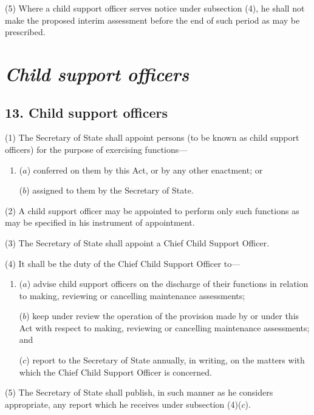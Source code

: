 \documentclass[12pt,a4paper]{article}
\begin{document}
(5) Where a child support officer serves notice under subsection (4), he shall not make the proposed interim assessment before the end of such period as may be prescribed.


\section{\itshape Child support officers}

\subsection{13. Child support officers}

(1) The Secretary of State shall appoint persons (to be known as child support officers) for the purpose of exercising functions—
\begin{enumerate}\item[]
($a$) conferred on them by this Act, or by any other enactment; or

($b$) assigned to them by the Secretary of State.
\end{enumerate}

(2) A child support officer may be appointed to perform only such functions as may be specified in his instrument of appointment.

(3) The Secretary of State shall appoint a Chief Child Support Officer.

(4) It shall be the duty of the Chief Child Support Officer to—
\begin{enumerate}\item[]
($a$) advise child support officers on the discharge of their functions in relation to making, reviewing or cancelling maintenance assessments;

($b$) keep under review the operation of the provision made by or under this Act with respect to making, reviewing or cancelling maintenance assessments; and

($c$) report to the Secretary of State annually, in writing, on the matters with which the Chief Child Support Officer is concerned.
\end{enumerate}

(5) The Secretary of State shall publish, in such manner as he considers appropriate, any report which he receives under subsection (4)($c$).
\end{document}
